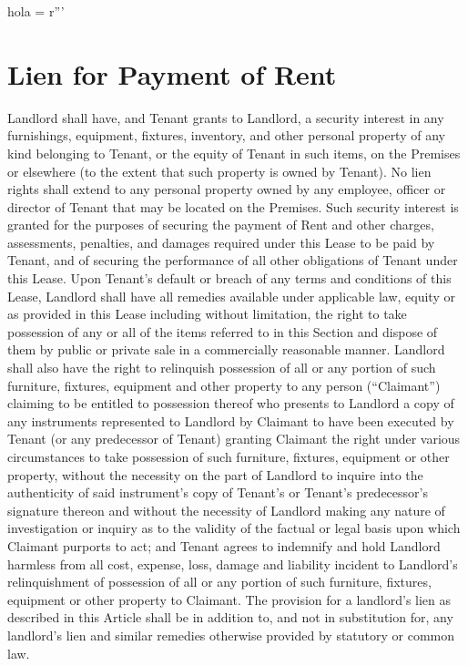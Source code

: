 hola = r'''\documentclass{article}
\begin{document}
\section{Lien for Payment of Rent}
    Landlord shall have, and Tenant grants to Landlord, a security interest in any furnishings, equipment, fixtures, inventory, and other personal property of any kind belonging to Tenant, or the equity of Tenant in such items, on the Premises or elsewhere (to the extent that such property is owned by Tenant). No lien rights shall extend to any personal property owned by any employee, officer or director of Tenant that may be located on the Premises. Such security interest is granted for the purposes of securing the payment of Rent and other charges, assessments, penalties, and damages required under this Lease to be paid by Tenant, and of securing the performance of all other obligations of Tenant under this Lease. Upon Tenant's default or breach of any terms and conditions of this Lease, Landlord shall have all remedies available under applicable law, equity or as provided in this Lease including without limitation, the right to take possession of any or all of the items referred to in this Section and dispose of them by public or private sale in a commercially reasonable manner. Landlord shall also have the right to relinquish possession of all or any portion of such furniture, fixtures, equipment and other property to any person (``Claimant'') claiming to be entitled to possession thereof who presents to Landlord a copy of any instruments represented to Landlord by Claimant to have been executed by Tenant (or any predecessor of Tenant) granting Claimant the right under various circumstances to take possession of such furniture, fixtures, equipment or other property, without the necessity on the part of Landlord to inquire into the authenticity of said instrument's copy of Tenant's or Tenant's predecessor's signature thereon and without the necessity of Landlord making any nature of investigation or inquiry as to the validity of the factual or legal basis upon which Claimant purports to act; and Tenant agrees to indemnify and hold Landlord harmless from all cost, expense, loss, damage and liability incident to Landlord's relinquishment of possession of all or any portion of such furniture, fixtures, equipment or other property to Claimant. The provision for a landlord's lien as described in this Article shall be in addition to, and not in substitution for, any landlord's lien and similar remedies otherwise provided by statutory or common law.
\end{document}

